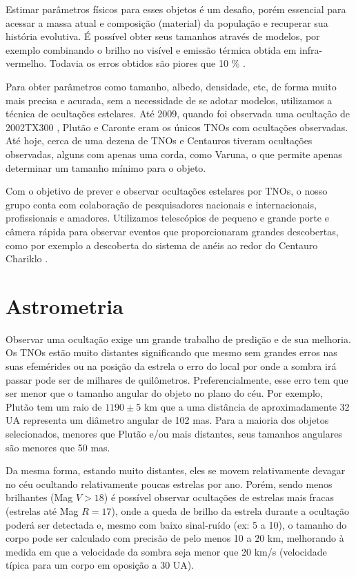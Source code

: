 \documentclass[12pt,a4paper]{report}
\begin{document}
Estimar parâmetros físicos para esses objetos é um desafio, porém essencial para acessar a massa atual e composição (material) da população e recuperar sua história evolutiva. É possível obter seus tamanhos através de modelos, por exemplo combinando o brilho no visível e emissão térmica obtida em infra-vermelho. Todavia os erros obtidos são piores que 10 \% \citep{Camargo2013}.

Para obter parâmetros como tamanho, albedo, densidade, etc, de forma muito mais precisa e acurada, sem a necessidade de se adotar modelos, utilizamos a técnica de ocultações estelares. Até 2009, quando foi observada uma ocultação de 2002TX300 \citep{Elliot2010}, Plutão e Caronte eram os únicos TNOs com ocultações observadas. Até hoje, cerca de uma dezena de TNOs e Centauros tiveram ocultações observadas, alguns com apenas uma corda, como Varuna, o que permite apenas determinar um tamanho mínimo para o objeto.

Com o objetivo de prever e observar ocultações estelares por TNOs, o nosso grupo conta com colaboração de pesquisadores nacionais e internacionais, profissionais e amadores. Utilizamos telescópios de pequeno e grande porte e câmera rápida para observar eventos que proporcionaram grandes descobertas, como por exemplo a descoberta do sistema de anéis ao redor do Centauro Chariklo \citep{BragaRibas2014}.



\section{Astrometria}
\label{Sec: TNOs-astrometria}

\indent \indent Observar uma ocultação exige um grande trabalho de predição e de sua melhoria. Os TNOs estão muito distantes significando que mesmo sem grandes erros nas suas efemérides ou na posição da estrela o erro do local por onde a sombra irá passar pode ser de milhares de quilômetros. Preferencialmente, esse erro tem que ser menor que o tamanho angular do objeto no plano do céu. Por exemplo, Plutão tem um raio de $1190 \pm 5$ km \cite{DiasOliveira2015} que a uma distância de aproximadamente 32 UA representa um diâmetro angular de 102 mas. Para a maioria dos objetos selecionados, menores que Plutão e/ou mais distantes, seus tamanhos angulares são menores que 50 mas.

Da mesma forma, estando muito distantes, eles se movem relativamente devagar no céu ocultando relativamente poucas estrelas por ano. Porém, sendo menos brilhantes (Mag $V > 18$) é possível observar ocultações de estrelas mais fracas (estrelas até Mag $R = 17$), onde a queda de brilho da estrela durante a ocultação poderá ser detectada e, mesmo com baixo sinal-ruído (ex: 5 a 10), o tamanho do corpo pode ser calculado com precisão de pelo menos 10 a 20 km, melhorando à medida em que a velocidade da sombra seja menor que 20 km/s (velocidade típica para um corpo em oposição a 30 UA).
\end{document}
